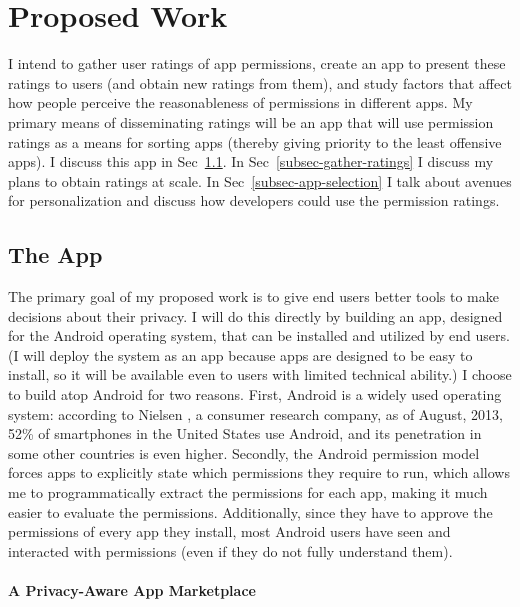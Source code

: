 \documentclass[11pt]{article}
\begin{document}
\section{Proposed Work}

I intend to gather user ratings of app permissions, create 
an app to present these ratings
to users (and obtain new ratings from them), and study factors that
affect how people perceive the reasonableness of permissions in
different apps. My primary means of disseminating ratings will be
an app that will use permission ratings as a means for sorting
apps (thereby giving priority to the least offensive apps). 
I discuss this app in Sec~\ref{subsec-the-apps}. 
In Sec~\ref{subsec-gather-ratings} 
I discuss my plans to obtain ratings at scale. In
Sec~\ref{subsec-app-selection} I talk about avenues for personalization 
and discuss how developers could use the permission ratings.

\subsection{The App}
\label{subsec-the-apps}

The primary goal of my proposed work is to give end users better tools to make decisions
about their privacy. I will do this directly by building an app, designed for the Android 
operating system, that can be installed 
and utilized by end users. (I will deploy the system as an app because 
apps are designed to be easy to install, so it will be available even to users 
with limited technical ability.) I choose to build atop Android for two reasons.
First, Android is a widely used operating system: according to Nielsen 
\cite{android-market-share}, a consumer research 
company, as of August, 2013, 52\% of smartphones in the United
States use Android, and its penetration in some other countries is
even higher.
Secondly, the Android permission model forces apps to explicitly state which permissions
they require to run, which allows me to programmatically extract the permissions for each 
app, making it much easier to evaluate the permissions. Additionally, 
since they have to approve the permissions of every app they install, 
most Android users have seen and interacted with permissions (even if they 
do not fully understand them).

\paragraph{A Privacy-Aware App Marketplace}
\label{subsubsec-privacy-store}
\end{document}
